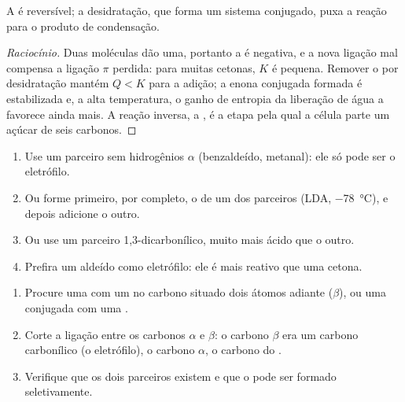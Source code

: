 \begin{proposition}\label{prop:b2:enolates-aldol:aldol-equilibrium}
A  é reversível; a desidratação, que forma um sistema conjugado, puxa a reação para
o produto de condensação.
\end{proposition}

\begin{proof}[Raciocínio]
Duas moléculas dão uma, portanto a  é negativa, e a nova ligação  mal
compensa a ligação $\pi$  perdida: para muitas cetonas, $K$ é pequena. Remover o  por
desidratação mantém $Q < K$ para a adição; a enona conjugada formada é estabilizada e, a alta
temperatura, o ganho de entropia da liberação de água a favorece ainda mais. A reação inversa, a
, é a etapa pela qual a célula parte um açúcar de seis carbonos.
\end{proof}

\begin{method}\label{met:b2:enolates-aldol:crossed-aldol}
\begin{enumerate}
  \item Use um parceiro sem hidrogênios $\alpha$ (benzaldeído, metanal): ele só pode ser o
        eletrófilo.
  \item Ou forme primeiro, por completo, o  de um dos parceiros (LDA, \qty{-78}{\degreeCelsius}),
        e depois adicione o outro.
  \item Ou use um parceiro 1,3-dicarbonílico, muito mais ácido que o outro.
  \item Prefira um aldeído como eletrófilo: ele é mais reativo que uma cetona.
\end{enumerate}
\end{method}

\begin{method}\label{met:b2:enolates-aldol:aldol-recognition}
\begin{enumerate}
  \item Procure uma  com um  no carbono situado dois átomos adiante ($\beta$), ou uma
         conjugada com uma .
  \item Corte a ligação entre os carbonos $\alpha$ e $\beta$: o carbono $\beta$ era um carbono carbonílico
        (o eletrófilo), o carbono $\alpha$, o carbono do .
  \item Verifique que os dois parceiros existem e que o  pode ser formado seletivamente.
\end{enumerate}
\end{method}

